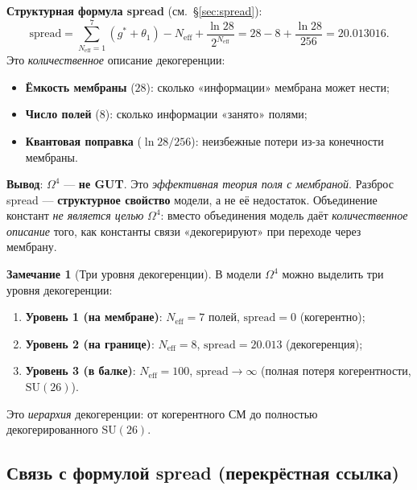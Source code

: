 \documentclass[11pt,a4paper]{article}
\newcommand{\SU}{\ensuremath{\mathrm{SU}}}
\newcommand{\Om}{\ensuremath{\Omega^4}}
\theoremstyle{definition}
\newtheorem{remark}[theorem]{Замечание}
\begin{document}
\medskip\noindent
\textbf{Структурная формула spread} (см.~\S\ref{sec:spread}):
\begin{equation}
    \boxed{
    \text{spread} = \sum_{N_{\text{eff}}=1}^{7}(g^* + \theta_1)
    - N_{\text{eff}} + \frac{\ln 28}{2^{N_{\text{eff}}}}
    = 28 - 8 + \frac{\ln 28}{256} = 20.013016.
    }
    \label{eq:spread-structural-membrane}
\end{equation}
Это \emph{количественное} описание декогеренции:
\begin{itemize}
    \item \textbf{Ёмкость мембраны} ($28$): сколько 
          «информации» мембрана может нести;
    \item \textbf{Число полей} ($8$): сколько информации 
          «занято» полями;
    \item \textbf{Квантовая поправка} ($\ln 28/256$): 
          неизбежные потери из-за конечности мембраны.
\end{itemize}

\medskip\noindent
\textbf{Вывод}: $\Om$ --- \textbf{не GUT}. Это 
\emph{эффективная теория поля с мембраной}. 
Разброс spread --- \textbf{структурное свойство} 
модели, а не её недостаток. Объединение констант 
\emph{не является целью} $\Om$: вместо объединения 
модель даёт \emph{количественное описание} того, 
как константы связи «декогерируют» при переходе 
через мембрану.

\begin{remark}[Три уровня декогеренции]
\label{rem:three-levels-decoherence}
В модели $\Om$ можно выделить три уровня декогеренции:
\begin{enumerate}
    \item \textbf{Уровень 1 (на мембране)}: 
          $N_{\text{eff}} = 7$ полей, 
          $\text{spread} = 0$ (когерентно);
    \item \textbf{Уровень 2 (на границе)}: 
          $N_{\text{eff}} = 8$, 
          $\text{spread} = 20.013$ (декогеренция);
    \item \textbf{Уровень 3 (в балке)}: 
          $N_{\text{eff}} = 100$, 
          $\text{spread} \to \infty$ (полная потеря 
          когерентности, $\SU(26)$).
\end{enumerate}
Это \emph{иерархия} декогеренции: от когерентного 
СМ до полностью декогерированного $\SU(26)$.
\end{remark}

\subsection{Связь с формулой spread (перекрёстная ссылка)}
\label{subsec:membrane-spread-link}
\end{document}
